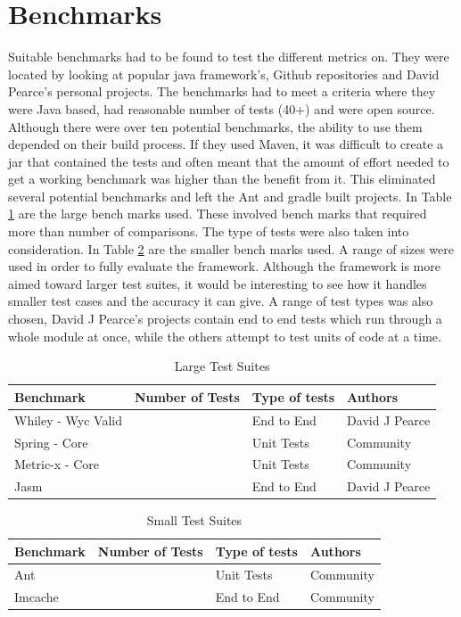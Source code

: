 \section{Benchmarks}
\label{S:bench}
Suitable benchmarks had to be found to test the different metrics on. They were located by looking at popular java framework's, Github repositories and David Pearce's personal projects. The benchmarks had to meet a criteria where they were Java based, had reasonable number of tests (40+) and were open source. Although there were over ten potential benchmarks, the ability to use them depended on their build process. If they used Maven, it was difficult to create a jar that contained the tests and often meant that the amount of effort needed to get a working benchmark was higher than the benefit from it. This eliminated several potential benchmarks and left the Ant and gradle built projects. In Table \ref{large_test} are the large bench marks used. These involved bench marks that required more than  number of comparisons. The type of tests were also taken into consideration. In Table \ref{small_test} are the smaller bench marks used. A range of sizes were used in order to fully evaluate the framework. Although the framework is more aimed toward larger test suites, it would be interesting to see how it handles smaller test cases and the accuracy it can give. A range of test types was also chosen, David J Pearce's projects contain end to end tests which run through a whole module at once, while the others attempt to test units of code at a time.

\begin{table}[]
\centering
\caption{Large Test Suites}
\label{large_test}
\begin{tabular}{|l|l|l|l|}
\hline
{\bf Benchmark}       &  {\bf Number of Tests} & {\bf Type of tests} & {\bf Authors}   \\ \hline
Whiley - Wyc Valid         &       &    End to End      & David J Pearce          \\ \hline
Spring - Core   &       &    Unit Tests      & Community \\ \hline
Metric-x - Core &       &    Unit Tests      & Community \\ \hline
Jasm              &             &    End to End      & David J Pearce \\ \hline

\end{tabular}
\end{table}

\begin{table}[]
\centering
\caption{Small Test Suites}
\label{small_test}
\begin{tabular}{|l|l|l|l|}
\hline
{\bf Benchmark}   & {\bf Number of Tests} & {\bf Type of tests} & {\bf Authors}  \\ \hline
Ant             &       &    Unit Tests      & Community \\ \hline
Imcache &           &    End to End        & Community \\ \hline
\end{tabular}
\end{table}


